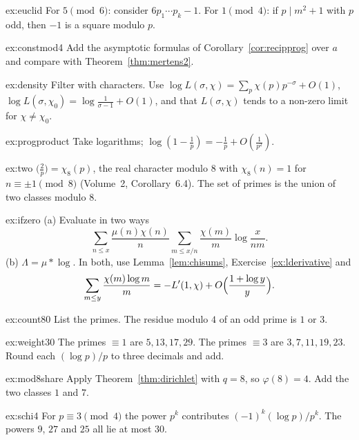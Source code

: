 \begin{hint}{ex:euclid}
For $5\pmod6$: consider $6p_1\cdots p_k-1$. For $1\pmod4$: if $p\mid m^2+1$ with $p$ odd, then $-1$ is a square modulo $p$.
\end{hint}
\begin{hint}{ex:constmod4}
Add the asymptotic formulas of Corollary~\ref{cor:recipprog} over $a$ and compare with Theorem~\ref{thm:mertens2}.
\end{hint}
\begin{hint}{ex:density}
Filter with characters. Use $\log L(\sigma,\chi)=\sum_p\chi(p)p^{-\sigma}+O(1)$, $\log L(\sigma,\chi_0)=\log\frac1{\sigma-1}+O(1)$, and that $L(\sigma,\chi)$ tends to a non-zero limit for $\chi\ne\chi_0$.
\end{hint}
\begin{hint}{ex:progproduct}
Take logarithms; $\log(1-\frac1p)=-\frac1p+O(\frac1{p^2})$.
\end{hint}
\begin{hint}{ex:two}
$\bigl(\frac2p\bigr)=\chi_8(p)$, the real character modulo $8$ with $\chi_8(n)=1$ for $n\equiv\pm1\pmod8$ (Volume~2, Corollary~6.4). The set of primes is the union of two
classes modulo $8$.
\end{hint}
\begin{hint}{ex:ifzero}
(a) Evaluate in two ways
\[
\sum_{n\le x}\frac{\mu(n)\chi(n)}n\sum_{m\le x/n}\frac{\chi(m)}m\log\frac x{nm}.
\]
(b) $\Lambda=\mu*\log$. In both, use Lemma~\ref{lem:chisums}, Exercise~\ref{ex:lderivative} and
\[
\sum_{m\le y}\frac{\chi(m)\log m}m=-L'(1,\chi)+O\Bigl(\frac{1+\log y}y\Bigr).
\]
\end{hint}

\begin{hint}{ex:count80}
List the primes. The residue modulo $4$ of an odd prime is $1$ or $3$.
\end{hint}
\begin{hint}{ex:weight30}
The primes $\equiv1$ are $5,13,17,29$. The primes $\equiv3$ are $3,7,11,19,23$. Round each $(\log p)/p$ to three decimals and add.
\end{hint}
\begin{hint}{ex:mod8share}
Apply Theorem~\ref{thm:dirichlet} with $q=8$, so $\varphi(8)=4$. Add the two classes $1$ and $7$.
\end{hint}
\begin{hint}{ex:schi4}
For $p\equiv3\pmod4$ the power $p^k$ contributes $(-1)^k(\log p)/p^k$. The powers $9$, $27$ and $25$ all lie at most $30$.
\end{hint}

